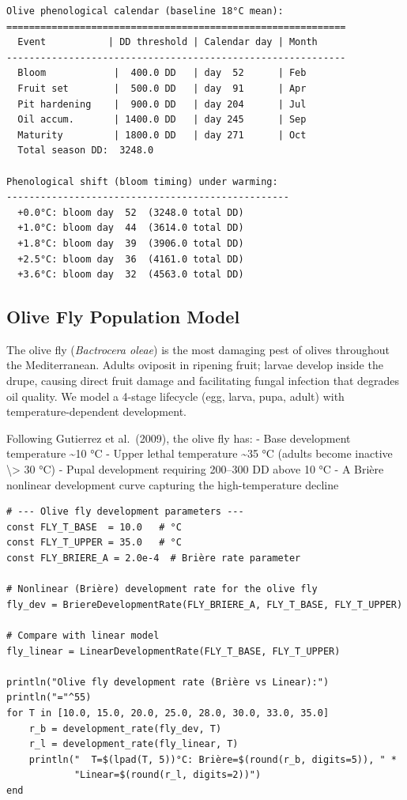 \begin{verbatim}
Olive phenological calendar (baseline 18°C mean):
============================================================
  Event           | DD threshold | Calendar day | Month
------------------------------------------------------------
  Bloom            |  400.0 DD   | day  52      | Feb
  Fruit set        |  500.0 DD   | day  91      | Apr
  Pit hardening    |  900.0 DD   | day 204      | Jul
  Oil accum.       | 1400.0 DD   | day 245      | Sep
  Maturity         | 1800.0 DD   | day 271      | Oct
  Total season DD:  3248.0

Phenological shift (bloom timing) under warming:
--------------------------------------------------
  +0.0°C: bloom day  52  (3248.0 total DD)
  +1.0°C: bloom day  44  (3614.0 total DD)
  +1.8°C: bloom day  39  (3906.0 total DD)
  +2.5°C: bloom day  36  (4161.0 total DD)
  +3.6°C: bloom day  32  (4563.0 total DD)
\end{verbatim}



\subsection{Olive Fly Population Model}



\label{10252668432662810715}{}


The olive fly (\emph{Bactrocera oleae}) is the most damaging pest of olives throughout the Mediterranean. Adults oviposit in ripening fruit; larvae develop inside the drupe, causing direct fruit damage and facilitating fungal infection that degrades oil quality. We model a 4-stage lifecycle (egg, larva, pupa, adult) with temperature-dependent development.



Following Gutierrez et al.~(2009), the olive fly has: - Base development temperature {\textasciitilde}10 °C - Upper lethal temperature {\textasciitilde}35 °C (adults become inactive {\textbackslash}> 30 °C) - Pupal development requiring 200–300 DD above 10 °C - A Brière nonlinear development curve capturing the high-temperature decline




\begin{verbatim}
# --- Olive fly development parameters ---
const FLY_T_BASE  = 10.0   # °C
const FLY_T_UPPER = 35.0   # °C
const FLY_BRIERE_A = 2.0e-4  # Brière rate parameter

# Nonlinear (Brière) development rate for the olive fly
fly_dev = BriereDevelopmentRate(FLY_BRIERE_A, FLY_T_BASE, FLY_T_UPPER)

# Compare with linear model
fly_linear = LinearDevelopmentRate(FLY_T_BASE, FLY_T_UPPER)

println("Olive fly development rate (Brière vs Linear):")
println("="^55)
for T in [10.0, 15.0, 20.0, 25.0, 28.0, 30.0, 33.0, 35.0]
    r_b = development_rate(fly_dev, T)
    r_l = development_rate(fly_linear, T)
    println("  T=$(lpad(T, 5))°C: Brière=$(round(r_b, digits=5)), " *
            "Linear=$(round(r_l, digits=2))")
end
\end{verbatim}




